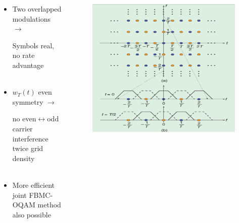 \documentclass[xcolor=dvipsnames,aspectratio=169]{beamer}
\begin{document}
{\pagebreak
\begin{columns}
 \begin{column}{7cm}
\begin{itemize}
\item Two overlapped modulations $\to$
\begin{itemize}
\itemcontra Symbols real, no rate advantage\\ \ \\
\end{itemize}
\item $w_T(t)$ even symmetry $\to$
\begin{itemize}
\itempro  no even$\leftrightarrow$odd carrier interference
\itempro  twice grid density\\ \ \\
\end{itemize}
\item More efficient joint FBMC-OQAM method also possible
\end{itemize}
 \end{column}
 \begin{column}{6cm}
  \begin{figure}
   \centering
   \includegraphics[width=.8\columnwidth]{OQAM-grid.png}
  \end{figure}
 \end{column}
\end{columns}
}
\end{document}
